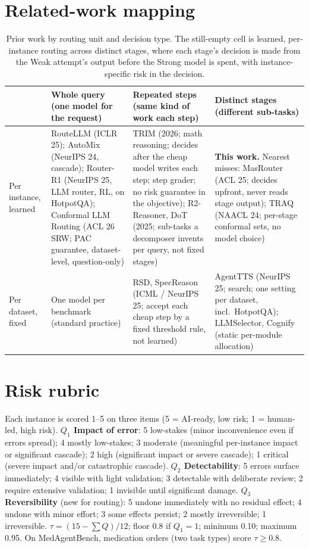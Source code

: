 \documentclass{article}
\begin{document}
\section{Related-work mapping}
\label{app:related}
\begin{table}[h]
\caption{Prior work by routing unit and decision type. The still-empty cell is learned, per-instance routing across distinct stages, where each stage's decision is made from the Weak attempt's output before the Strong model is spent, with instance-specific risk in the decision.}
\label{tab:gap}
\centering\small
\begin{tabular}{@{}p{2.0cm}p{3.5cm}p{3.5cm}p{3.7cm}@{}}
\toprule
& Whole query (one model for the request) & Repeated steps (same kind of work each step) & Distinct stages (different sub-tasks)\\
\midrule
Per instance, learned & RouteLLM (ICLR 25); AutoMix (NeurIPS 24, cascade); Router-R1 (NeurIPS 25, LLM router, RL, on HotpotQA); Conformal LLM Routing (ACL 26 SRW; PAC guarantee, dataset-level, question-only) & TRIM (2026; math reasoning; decides after the cheap model writes each step; step grader; no risk guarantee in the objective); R2-Reasoner, DoT (2025; sub-tasks a decomposer invents per query, not fixed stages) & \textbf{This work.} Nearest misses: MasRouter (ACL 25; decides upfront, never reads stage output); TRAQ (NAACL 24; per-stage conformal sets, no model choice)\\
\addlinespace
Per dataset, fixed & One model per benchmark (standard practice) & RSD, SpecReason (ICML / NeurIPS 25; accept each cheap step by a fixed threshold rule, not learned) & AgentTTS (NeurIPS 25; search; one setting per dataset, incl.\ HotpotQA); LLMSelector, Cognify (static per-module allocation)\\
\bottomrule
\end{tabular}
\end{table}

\section{Risk rubric}
\label{app:rubric}
Each instance is scored 1--5 on three items (5 = AI-ready, low risk; 1 = human-led, high risk). \textbf{$Q_1$ Impact of error}: 5 low-stakes (minor inconvenience even if errors spread); 4 mostly low-stakes; 3 moderate (meaningful per-instance impact or significant cascade); 2 high (significant impact or severe cascade); 1 critical (severe impact and/or catastrophic cascade). \textbf{$Q_2$ Detectability}: 5 errors surface immediately; 4 visible with light validation; 3 detectable with deliberate review; 2 require extensive validation; 1 invisible until significant damage. \textbf{$Q_3$ Reversibility} (new for routing): 5 undone immediately with no residual effect; 4 undone with minor effort; 3 some effects persist; 2 mostly irreversible; 1 irreversible. $\tau=(15-\sum Q)/12$; floor 0.8 if $Q_1{=}1$; minimum 0.10; maximum 0.95. On MedAgentBench, medication orders (two task types) score $\tau\ge0.8$.
\end{document}
